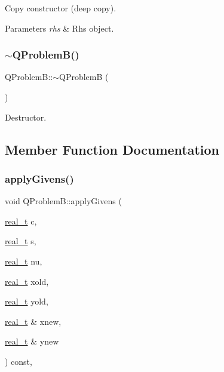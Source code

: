 Copy constructor (deep copy). 
\begin{DoxyParams}{Parameters}
{\em rhs} & Rhs object. \\
\hline
\end{DoxyParams}
\mbox{\label{class_q_problem_b_a9b7c6eb715d0d16ff8f3e7882b3982e7}} 
\subsubsection{\texorpdfstring{$\sim$\+Q\+Problem\+B()}{~QProblemB()}}
{\footnotesize\ttfamily Q\+Problem\+B\+::$\sim$\+Q\+ProblemB (\begin{DoxyParamCaption}{ }\end{DoxyParamCaption})\hspace{0.3cm}{\ttfamily [virtual]}}

Destructor. 

\subsection{Member Function Documentation}
\mbox{\label{class_q_problem_b_a340df2253c15c89c3f34db472a506980}} 
\subsubsection{\texorpdfstring{apply\+Givens()}{applyGivens()}}
{\footnotesize\ttfamily void Q\+Problem\+B\+::apply\+Givens (\begin{DoxyParamCaption}\item[{\hyperlink{qp_o_a_s_e_s__wrapper_8h_a0d00e2b3dfadee81331bbb39068570c4}{real\+\_\+t}}]{c,  }\item[{\hyperlink{qp_o_a_s_e_s__wrapper_8h_a0d00e2b3dfadee81331bbb39068570c4}{real\+\_\+t}}]{s,  }\item[{\hyperlink{qp_o_a_s_e_s__wrapper_8h_a0d00e2b3dfadee81331bbb39068570c4}{real\+\_\+t}}]{nu,  }\item[{\hyperlink{qp_o_a_s_e_s__wrapper_8h_a0d00e2b3dfadee81331bbb39068570c4}{real\+\_\+t}}]{xold,  }\item[{\hyperlink{qp_o_a_s_e_s__wrapper_8h_a0d00e2b3dfadee81331bbb39068570c4}{real\+\_\+t}}]{yold,  }\item[{\hyperlink{qp_o_a_s_e_s__wrapper_8h_a0d00e2b3dfadee81331bbb39068570c4}{real\+\_\+t} \&}]{xnew,  }\item[{\hyperlink{qp_o_a_s_e_s__wrapper_8h_a0d00e2b3dfadee81331bbb39068570c4}{real\+\_\+t} \&}]{ynew }\end{DoxyParamCaption}) const\hspace{0.3cm}{\ttfamily [inline]}, {\ttfamily [protected]}}


